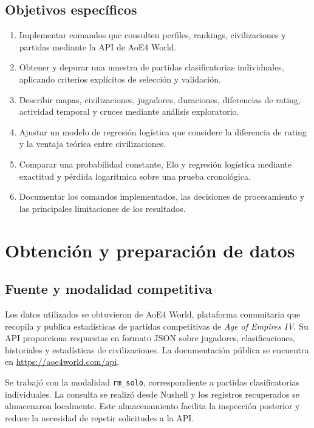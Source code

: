 \documentclass[12pt,a4paper]{article}
\begin{document}
\subsection{Objetivos específicos}
\begin{enumerate}[leftmargin=1.1cm]
\item Implementar comandos que consulten perfiles, rankings, civilizaciones y partidas mediante la API de AoE4 World.
\item Obtener y depurar una muestra de partidas clasificatorias individuales, aplicando criterios explícitos de selección y validación.
\item Describir mapas, civilizaciones, jugadores, duraciones, diferencias de rating, actividad temporal y cruces mediante análisis exploratorio.
\item Ajustar un modelo de regresión logística que considere la diferencia de rating y la ventaja teórica entre civilizaciones.
\item Comparar una probabilidad constante, Elo y regresión logística mediante exactitud y pérdida logarítmica sobre una prueba cronológica.
\item Documentar los comandos implementados, las decisiones de procesamiento y las principales limitaciones de los resultados.
\end{enumerate}

\section{Obtención y preparación de datos}
\subsection{Fuente y modalidad competitiva}

Los datos utilizados se obtuvieron de AoE4 World, plataforma comunitaria que recopila y publica estadísticas de partidas competitivas de \textit{Age of Empires IV}. Su API proporciona respuestas en formato JSON sobre jugadores, clasificaciones, historiales y estadísticas de civilizaciones. La documentación pública se encuentra en \url{https://aoe4world.com/api}.

Se trabajó con la modalidad \texttt{rm\_solo}, correspondiente a partidas clasificatorias individuales. La consulta se realizó desde Nushell y los registros recuperados se almacenaron localmente. Este almacenamiento facilita la inspección posterior y reduce la necesidad de repetir solicitudes a la API.
\end{document}
